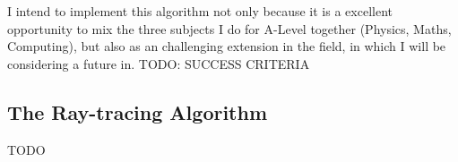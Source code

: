 \documentclass[../main.tex]{subfiles}
\begin{document}
I intend to implement this algorithm not only because it is a excellent opportunity to mix the three subjects I do for A-Level together (Physics, Maths, Computing), but also as an challenging extension in the field, in which I will be considering a future in.
TODO: SUCCESS CRITERIA
\subsection{The Ray-tracing Algorithm}
TODO

\end{document}
